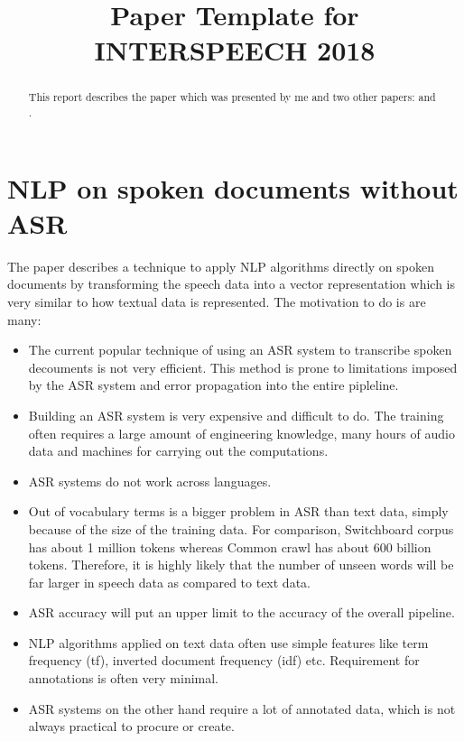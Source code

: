 \documentclass[a4paper]{article}
\title{Paper Template for INTERSPEECH 2018}
\begin{document}
\maketitle
%
\begin{abstract}
  This report describes the paper \cite{dredze2010nlp} which was presented by me and two other papers: \cite{Davis80-COP} and \cite{Davis80-COP}.
\end{abstract}

\section{NLP on spoken documents without ASR}
The paper \cite{dredze2010nlp} describes a technique to apply NLP algorithms directly on spoken documents by transforming the speech data into a vector representation which is very similar to how textual data is represented. The motivation to do is are many:

\begin{itemize}
\item The current popular technique of using an ASR system to transcribe spoken decouments is not very efficient. This method is prone to limitations imposed by the ASR system and error propagation into the entire pipleline.
\item Building an ASR system is very expensive and difficult to do. The training often requires a large amount of engineering knowledge, many hours of audio data and machines for carrying out the computations.
\item ASR systems do not work across languages.
\item Out of vocabulary terms is a bigger problem in ASR than text data, simply because of the size of the training data. For comparison, Switchboard corpus has about 1 million tokens whereas Common crawl has about 600 billion tokens. Therefore, it is highly likely that the number of unseen words will be far larger in speech data as compared to text data.
\item ASR accuracy will put an upper limit to the accuracy of the overall pipeline.
\item NLP algorithms applied on text data often use simple features like term frequency (tf), inverted document frequency (idf) etc. Requirement for annotations is often very minimal.
\item ASR systems on the other hand require a lot of annotated data, which is not always practical to procure or create.
\end{itemize}
\end{document}
